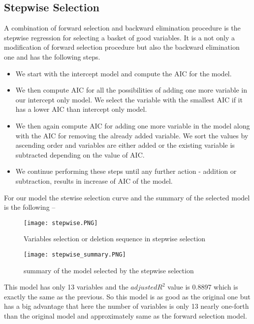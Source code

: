 \documentclass[A4paper,11pt]{report}
\begin{document}
	 \subsection{Stepwise Selection}A combination of forward selection and backward elimination procedure is the stepwise regression for selecting a basket of good variables. It is a not only a modification of forward selection procedure but also the backward elimination one and has the following steps.
	 \begin{itemize}
	 	\vspace{-0.2 cm}\item We start with the intercept model and compute the AIC for the model.
	 	\vspace{-0.2 cm}\item We then compute AIC for all the possibilities of adding one more variable in our   intercept only model. We select the variable with the smallest AIC if it has a lower AIC than intercept only model.
	 	\vspace{-0.2 cm}\item We then again compute AIC for adding one more variable in the model along with the AIC for removing the already added variable. We sort the values by ascending order and variables are either added or the existing variable is subtracted depending on the value of AIC.
	 	\vspace{-0.2 cm}\item We continue performing these steps until any further action - addition or subtraction, results in increase of AIC of the model.
	 \end{itemize}
	 \par For our model the stewise selection curve and the summary of the selected model is the following --
	 \begin{figure}[H]
	 	\texttt{[image: stepwise.PNG]}
	 	\caption {Variables selection or deletion sequence in stepwise selection}
	 \end{figure}
	 \begin{figure}[H]
	 	\texttt{[image: stepwise\_summary.PNG]}
	 	\caption {summary of the model selected by the stepwise selection}
	 \end{figure}
	 \par This model has only 13 variables and the $adjusted R^2$ value is 0.8897 which is exactly the same as the previous. So this model is as good as the original one but has a big advantage that here the number of variables is only 13 nearly one-forth than the original model and approximately same as the forward selection model.\\
\end{document}
